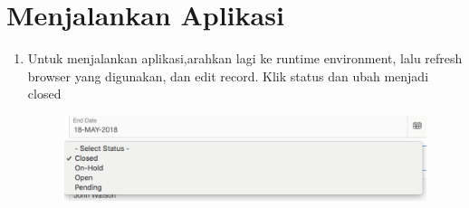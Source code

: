 \section{Menjalankan Aplikasi}
\begin{enumerate}
    \item{Untuk menjalankan aplikasi,arahkan lagi ke runtime environment, lalu refresh browser yang digunakan, dan edit record. Klik status dan ubah menjadi closed}
    
\begin{figure}[!htbp]
    \centering
    \includegraphics[scale=0.5]{section/gambar_bab2/status5.png}
    \label{penanda}
\end{figure}
\end{enumerate}


